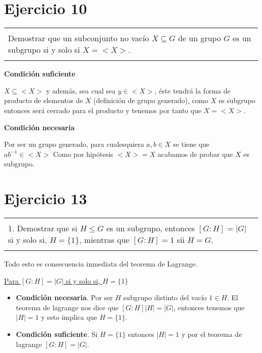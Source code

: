 \documentclass[12pt]{article}
\newenvironment{micaja}
{
    \begin{center}
    \begin{tabular}{|p{0.9\textwidth}|}
    \hline\\
    }   
    {   
    \\\\\hline
    \end{tabular} 
    \end{center}
    }
\begin{document}
\section[Ejercicio 10]{Ejercicio 10 }
\begin{micaja}
Demostrar que un subconjunto no vacío $X \subseteq G$ de un grupo $G$ es un subgrupo si y solo si $X = <X>$.
\end{micaja}


\textbf{Condición suficiente}

$X \subseteq <X>$ y además, sea cual sea $y \in <X>$, éste tendrá la forma de producto de elementos de $X$ (definición de grupo generado),
 como $X$ es subgrupo entonces será cerrado para el producto y tenemos por tanto que $X = <X>$.

 \textbf{Condición necesaria}  

Por ser un grupo generado, para cualesquiera $a,b \in X$ se tiene que $ab^{-1} \in <X>$ Como por hipótesis $<X> = X$ acabamos de probar
que $X$ es subgrupo. 
\newpage

\section[Ejercicio 13]{Ejercicio 13}

    \begin{micaja}
    1. Demostrar que si $H \leq G$ es un subgrupo, entonces $[G:H] = |G|$ si y solo si, $H=\{1\}$, mientras que 
    $[G:H]=1$ sii $H=G$.
    \end{micaja}

    Todo esto es consecuencia inmediata del teorema de Lagrange.
    
    
\underline{Para $[G:H] = |G|$ si y solo si, $H=\{1\}$}

    \begin{itemize}
        \item 
   
    \textbf{Condición necesaria}. Por ser $H$ subgrupo distinto del vacío $1\in H$. El teorema de lagrange nos dice 
    que $[G:H] |H| = |G|$, entonces tenemos que $|H|=1$ y esto implica que $H=\{1\}$.

    \item \textbf{Condición suficiente}. Si $H=\{1\}$ entonces $|H|=1$ y por el teorema de lagrange $[G:H] = |G|$.
    \end{itemize}
\end{document}
